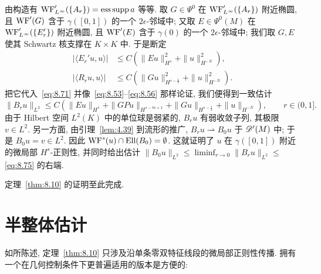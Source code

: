 由构造有 $\operatorname{WF}'_{L^\infty}(\{A_r\}) = \operatorname{ess\,supp} a$ 等等. 取 $G \in \Psi^0$ 在 $\operatorname{WF}'_{L^\infty}(\{A_r\})$ 附近椭圆, 且 $\operatorname{WF}'(G)$ 含于 $\gamma([0, 1])$ 的一个 $2\epsilon$-邻域中; 又取 $E \in \Psi^0(M)$ 在 $\operatorname{WF}'_{L^\infty}(\{E_r'\})$ 附近椭圆, 且 $\operatorname{WF}'(E)$ 含于 $\gamma(0)$ 的一个 $2\epsilon$-邻域中; 我们取 $G, E$ 使其 Schwartz 核支撑在 $K \times K$ 中. 于是断定
\begin{equation}\label{eq:8.74}
    \begin{aligned}
        | \langle E_r' u, u \rangle | &\le C\left( \| E u \|_{H^s}^2 + \| u \|_{H^{-N}}^2 \right), \\
        | \langle R_r u, u \rangle | &\le C\left( \| G u \|_{H^{s-\frac{1}{2}}}^2 + \| u \|_{H^{-N}}^2 \right).
    \end{aligned}
\end{equation}
把它代入~\eqref{eq:8.71} 并像~\eqref{eq:8.53}--\eqref{eq:8.56} 那样论证, 我们便得到一致估计
\begin{equation}\label{eq:8.75}
    \| B_r u \|_{L^2} \le C\left( \| E u \|_{H^s} + \| G P u \|_{H^{s-m+1}} + \| G u \|_{H^{s-\frac{1}{2}}} + \| u \|_{H^{-N}} \right), \qquad r \in (0, 1].
\end{equation}
由于 Hilbert 空间 $L^2(K)$ 中的单位球是弱紧的, $B_r u$ 有弱收敛子列, 其极限 $v \in L^2$. 另一方面, 由引理~\ref{lem:4.39} 到流形的推广, $B_r u \rightharpoonup B_0 u$ 于 $\mathscr{D}'(M)$ 中; 于是 $B_0 u = v \in L^2$. 因此 $\operatorname{WF}^s(u) \cap \operatorname{Ell}(B_0) = \emptyset$. 这就证明了 $u$ 在 $\gamma([0, 1])$ 附近的微局部 $H^s$-正则性, 并同时给出估计 $\| B_0 u \|_{L^2} \le \liminf_{r \to 0}\| B_r u \|_{L^2} \le$ \eqref{eq:8.75} 的右端.

定理~\ref{thm:8.10} 的证明至此完成.



\section{半整体估计}\label{sec:8.6}

如所陈述, 定理~\ref{thm:8.10} 只涉及沿单条零双特征线段的微局部正则性传播. 拥有一个在几何控制条件下更普遍适用的版本是方便的:


